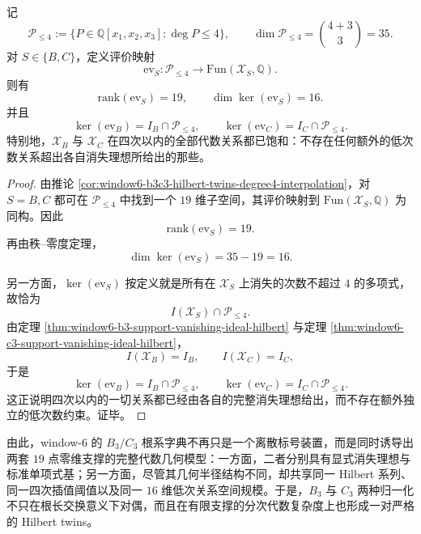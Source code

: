 \begin{theorem}\label{thm:window6-b3c3-degree4-relation-space-saturation}
记
\[
\mathcal P_{\le 4}:=
\{P\in \mathbb Q[x_1,x_2,x_3]:\deg P\le 4\},
\qquad
\dim \mathcal P_{\le 4}=\binom{4+3}{3}=35.
\]
对 \(S\in\{B,C\}\)，定义评价映射
\[
\mathrm{ev}_S:\mathcal P_{\le 4}\to \mathrm{Fun}(\mathscr X_S,\mathbb Q).
\]
则有
\[
\mathrm{rank}(\mathrm{ev}_S)=19,
\qquad
\dim\ker(\mathrm{ev}_S)=16.
\]
并且
\[
\ker(\mathrm{ev}_B)=I_B\cap \mathcal P_{\le 4},
\qquad
\ker(\mathrm{ev}_C)=I_C\cap \mathcal P_{\le 4}.
\]
特别地，\(\mathscr X_B\) 与 \(\mathscr X_C\) 在四次以内的全部代数关系都已饱和：不存在任何额外的低次数关系超出各自消失理想所给出的那些。
\end{theorem}
\begin{proof}
由推论 \ref{cor:window6-b3c3-hilbert-twins-degree4-interpolation}，对 \(S=B,C\) 都可在 \(\mathcal P_{\le 4}\) 中找到一个 \(19\) 维子空间，其评价映射到 \(\mathrm{Fun}(\mathscr X_S,\mathbb Q)\) 为同构。因此
\[
\mathrm{rank}(\mathrm{ev}_S)=19.
\]
再由秩--零度定理，
\[
\dim\ker(\mathrm{ev}_S)=35-19=16.
\]

另一方面，\(\ker(\mathrm{ev}_S)\) 按定义就是所有在 \(\mathscr X_S\) 上消失的次数不超过 \(4\) 的多项式，故恰为
\[
I(\mathscr X_S)\cap \mathcal P_{\le 4}.
\]
由定理 \ref{thm:window6-b3-support-vanishing-ideal-hilbert} 与定理 \ref{thm:window6-c3-support-vanishing-ideal-hilbert}，
\[
I(\mathscr X_B)=I_B,
\qquad
I(\mathscr X_C)=I_C,
\]
于是
\[
\ker(\mathrm{ev}_B)=I_B\cap \mathcal P_{\le 4},
\qquad
\ker(\mathrm{ev}_C)=I_C\cap \mathcal P_{\le 4}.
\]
这正说明四次以内的一切关系都已经由各自的完整消失理想给出，而不存在额外独立的低次数约束。证毕。
\end{proof}

\noindent
由此，window-\(6\) 的 \(B_3/C_3\) 根系字典不再只是一个离散标号装置，而是同时诱导出两套 \(19\) 点零维支撑的完整代数几何模型：一方面，二者分别具有显式消失理想与标准单项式基；另一方面，尽管其几何半径结构不同，却共享同一 Hilbert 系列、同一四次插值阈值以及同一 \(16\) 维低次关系空间规模。于是，\(B_3\) 与 \(C_3\) 两种归一化不只在根长交换意义下对偶，而且在有限支撑的分次代数复杂度上也形成一对严格的 Hilbert twins。

\endinput
